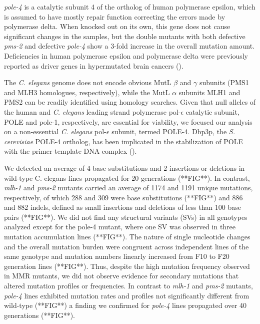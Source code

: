 \textit{pole-4} is a catalytic subunit 4 of the ortholog of human polymerase epsilon, 
which is assumed to have mostly repair function correcting the errors made by polymerase 
delta. When knocked out on its own, this gene does not cause significant changes in 
the samples, but the double mutants with both defective \textit{pms-2} and defective 
\textit{pole-4} show a 3-fold increase in the overall mutation amount. Deficiencies 
in human polymerase epsilon and polymerase delta were previously reported as driver 
genes in hypermutated brain cancers (\cite{Shlien2015-vw}).

The \textit{C. elegans} genome does not encode obvious MutL $\beta$ and $\gamma$ subunits 
(PMS1 and MLH3 homologues, respectively), while the MutL $\alpha$ subunits MLH1 and PMS2 
can be readily identified using homology searches. Given that null alleles of the human 
and \textit{C. elegans} leading strand polymerase pol-$\epsilon$ catalytic subunit, 
POLE and pole-1, respectively, are essential for viability, we focused our analysis 
on a non-essential \textit{C. elegans} pol-$\epsilon$ subunit, termed POLE-4. Dbp3p, 
the \textit{S. cerevisiae} POLE-4 ortholog, has been implicated in the stabilization 
of POLE with the primer-template DNA complex (\cite{Aksenova2010-rt}).

We detected an average of 4 base substitutions and 2 insertions or deletions in 
wild-type C. elegans lines propagated for 20 generations (**FIG**). In contrast, 
\textit{mlh-1} and \textit{pms-2} mutants carried an average of 1174 and 1191 unique mutations, 
respectively, of which 288 and 309 were base substitutions (**FIG**) and 886 
and 882 indels, defined as small insertions and deletions of less than 100 
base pairs (**FIG**). We did not find any structural variants (SVs) in all 
genotypes analyzed except for the pole-4 mutant, where one SV was observed 
in three mutation accumulation lines (**FIG**). The nature 
of single nucleotide changes and the overall mutation burden were congruent 
across independent lines of the same genotype and mutation numbers linearly 
increased from F10 to F20 generation lines (**FIG**). Thus, despite 
the high mutation frequency observed in MMR mutants, we did not observe 
evidence for secondary mutations that altered mutation profiles or frequencies. 
In contrast to \textit{mlh-1} and \textit{pms-2} mutants, \textit{pole-4} lines exhibited mutation rates 
and profiles not significantly different from wild-type (**FIG**) a 
finding we confirmed for \textit{pole-4} lines propagated over 40 generations (**FIG**).


